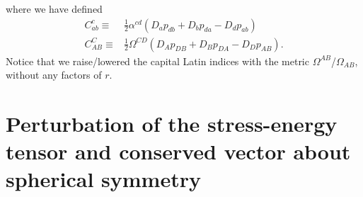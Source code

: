 \documentclass[12pt]{report}
\begin{document}
where we have defined
\begin{align}
    C^c_{ab}
    \equiv&
    \frac{1}{2}\alpha^{cd}
    \left(
        D_ap_{db}
        +
        D_bp_{da}
        -
        D_dp_{ab}
    \right)
    \nonumber\\
    C^C_{AB}
    \equiv&
    \frac{1}{2}\Omega^{CD}
    \left(
        D_Ap_{DB}
        +
        D_Bp_{DA}
        -
        D_Dp_{AB}
    \right)
    .
\end{align}
Notice that we raise/lowered the capital Latin indices with
the metric $\Omega^{AB}$/$\Omega_{AB}$, without any factors of $r$.

\section{Perturbation of the stress-energy tensor and conserved vector 
about spherical symmetry\label{sec:pert_stress_energy_tensor_ss}}
\end{document}
